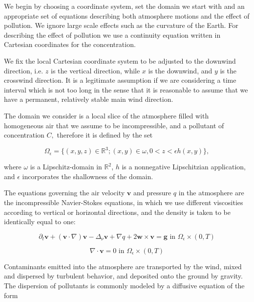 \documentclass[11pt]{article}
\begin{document}
We begin by choosing a coordinate system, set the domain we start with and an appropriate set of equations describing both atmosphere motions and the effect of pollution. We ignore large scale effects such as the curvature of the Earth. For describing the effect of pollution we use a continuity equation written in Cartesian coordinates for the concentration.

We fix the local Cartesian coordinate system to be adjusted to the downwind direction, i.e. $z$ is the vertical direction, while $x$ is the downwind, and $y$ is the crosswind direction. It is a legitimate assumption if we are considering a time interval which is not too long in the sense that it is reasonable to assume that we have a permanent, relatively stable main wind direction.  

The domain we consider is a local slice of the atmosphere filled with homogeneous air that we assume to be incompressible, and a pollutant of concentration $C,$ therefore it is defined by the set

\begin{equation}
  \Omega_{\epsilon} = \{(x,y,z) \in \mathbb{R}^3 ; (x,y) \in \omega, 0 < z < \epsilon h(x,y) \},
\end{equation}

where $\omega$ is a Lipschitz-domain in $\mathbb{R}^2$, $h$ is a nonnegative Lipschitzian application, and $\epsilon$ incorporates the shallowness of the domain.

The equations governing the air velocity $\mathbf{v}$ and pressure $q$ in the atmosphere are the incompressible Navier-Stokes equations, in which we use different viscosities according to vertical or horizontal directions, and the density is taken to be identically equal to one:

\begin{equation}
  \partial_t \mathbf{v} + (\mathbf{v} \cdot \nabla)\mathbf{v} -\Delta_{\nu} \mathbf{v} + \nabla q + 2 \mathbf{w} \times \mathbf{v}= \mathbf{g} \text{ in } \Omega_{\epsilon} \times (0,T)
\end{equation}
    
\begin{equation}
  \nabla \cdot \mathbf{v} = 0 \text{ in } \Omega_{\epsilon} \times (0,T)
\end{equation}

Contaminants emitted into the atmosphere are transported by the wind, mixed and dispersed by turbulent behavior, and deposited onto the ground by gravity. The dispersion of pollutants is commonly modeled by a diffusive equation of the form
    
\end{document}
